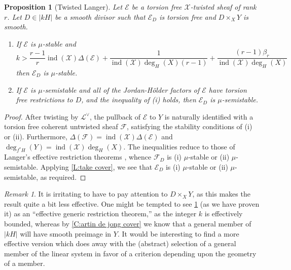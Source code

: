 \documentclass[11pt]{amsart}
\newcommand{\ms}[1]{\mathscr #1}
\DeclareMathOperator{\ind}{ind}
\renewcommand{\[}{[\!\hspace{0.03em}[}
\renewcommand{\]}{]\!\hspace{0.03em}]}
\renewcommand{\(}{(\!\hspace{0.03em}(}
\renewcommand{\)}{)\!\hspace{0.03em})}
\newtheorem{prop}[lem]{Proposition}
\theoremstyle{definition}
\theoremstyle{remark}
\newtheorem{remark}[lem]{Remark}
\begin{document}
\begin{prop}[Twisted Langer]\label{P:twisted langer} Let $\ms E$ be a torsion free $\ms X$-twisted 
sheaf of rank $r$.  Let $D\in |kH|$ be a smooth divisor such that 
$\ms E_{D}$ is torsion free and $D\times_{X}Y$ is smooth.
\begin{enumerate}
    \item[(i)] If $\ms E$ is $\mu$-stable and 
    $$k>\frac{r-1}{r}\ind(\ms X)\Delta(\ms E)+\frac{1}{\ind(\ms 
    X)\deg_{H}(X)(r-1)}+\frac{(r-1)\beta_{r}}{\ind(\ms 
    X)\deg_{H}(X)}$$
    then $\ms E_{D}$ is $\mu$-stable.

    \item[(ii)] If $\ms E$ is $\mu$-semistable and all of the 
    Jordan-H\"older factors of $\ms E$ have torsion free restrictions 
    to $D$, and the inequality of (i) holds, then $\ms E_{D}$ is 
    $\mu$-semistable.
\end{enumerate}
\end{prop}
\begin{proof} After twisting by $\ms L^{\vee}$, the pullback of $\ms E$ to $Y$ is naturally identified 
with a torsion free coherent untwisted sheaf $\ms F$, satisfying the 
stability conditions of (i) or (ii).  Furthermore, $\Delta(\ms 
F)=\ind(\ms X)\Delta(\ms E)$ and $\deg_{f^{\ast}H}(Y)=\ind(\ms 
X)\deg_{H}(X)$.  The inequalities reduce to those of Langer's 
effective restriction theorems \cite[5.2 and 5.4]{langer}, whence $\ms 
F_{D}$ is (i) $\mu$-stable or (ii) $\mu$-semistable.  Applying 
\ref{L:take cover}, we see that $\ms E_{D}$ is (i) $\mu$-stable or 
(ii) $\mu$-semistable, as required.
\end{proof}

\begin{remark} It is irritating to have to pay attention to 
$D\times_{X}Y$, as this makes the result quite a bit less effective.  
One might be tempted to see \ref{P:twisted langer} (as we have proven 
it) as an ``effective generic restriction theorem,'' as the integer 
$k$ is effectively bounded, whereas by \ref{C:artin de jong cover} we 
know that a general member of $|kH|$ will have smooth preimage in 
$Y$.  It would be interesting to find a more effective version which does away with the (abstract) selection of a general member of the linear system in favor of a criterion depending upon the geometry of a member.
\end{remark}
\end{document}
